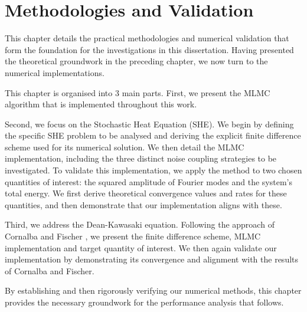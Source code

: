 \chapter{Methodologies and Validation}\label{chap:method_and_validation}

This chapter details the practical methodologies and numerical validation 
that form the foundation for the investigations in this dissertation. Having 
presented the theoretical groundwork in the preceding chapter, we now 
turn to the numerical implementations.

This chapter is organised into 3 main parts. First, 
we present the MLMC algorithm that is implemented throughout this work.


Second, we focus on the Stochastic Heat Equation (SHE). We begin
by defining the specific SHE problem to be analysed and 
deriving the explicit finite difference scheme 
used for its numerical solution. We then 
detail the MLMC implementation,
including the three distinct noise coupling strategies to be investigated. 
To validate this implementation, we apply the method to two  
chosen quantities of interest: the squared amplitude of
Fourier modes and the system's total energy. We first derive 
theoretical convergence values and rates for these quantities, and then demonstrate that
our implementation aligns with these.

Third, we address the Dean-Kawasaki equation. Following 
the approach of Cornalba and Fischer \cite{cornalba2025multilevel}, 
we present the finite difference scheme, MLMC implementation and target 
quantity of interest. 
We then again validate our implementation
by demonstrating its convergence and alignment with the results of Cornalba and Fischer.

By establishing and then rigorously verifying our numerical methods, this chapter 
provides the necessary groundwork for the performance analysis that follows.






